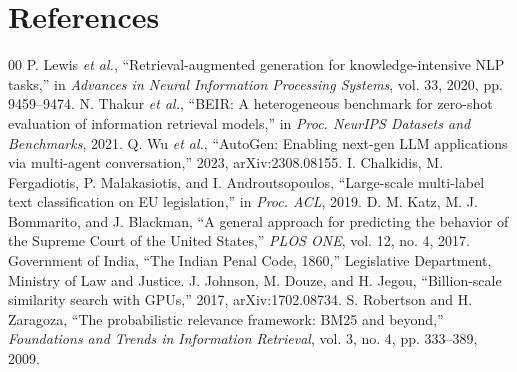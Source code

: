 \documentclass[conference]{IEEEtran}
\begin{document}
\section*{References}

\begin{thebibliography}{00}
 P. Lewis \textit{et al.}, ``Retrieval-augmented generation for knowledge-intensive NLP tasks,'' in \textit{Advances in Neural Information Processing Systems}, vol. 33, 2020, pp. 9459--9474.
 N. Thakur \textit{et al.}, ``BEIR: A heterogeneous benchmark for zero-shot evaluation of information retrieval models,'' in \textit{Proc. NeurIPS Datasets and Benchmarks}, 2021.
 Q. Wu \textit{et al.}, ``AutoGen: Enabling next-gen LLM applications via multi-agent conversation,'' 2023, arXiv:2308.08155.
 I. Chalkidis, M. Fergadiotis, P. Malakasiotis, and I. Androutsopoulos, ``Large-scale multi-label text classification on EU legislation,'' in \textit{Proc. ACL}, 2019.
 D. M. Katz, M. J. Bommarito, and J. Blackman, ``A general approach for predicting the behavior of the Supreme Court of the United States,'' \textit{PLOS ONE}, vol. 12, no. 4, 2017.
 Government of India, ``The Indian Penal Code, 1860,'' Legislative Department, Ministry of Law and Justice.
 J. Johnson, M. Douze, and H. Jegou, ``Billion-scale similarity search with GPUs,'' 2017, arXiv:1702.08734.
 S. Robertson and H. Zaragoza, ``The probabilistic relevance framework: BM25 and beyond,'' \textit{Foundations and Trends in Information Retrieval}, vol. 3, no. 4, pp. 333--389, 2009.
\end{thebibliography}
\end{document}
